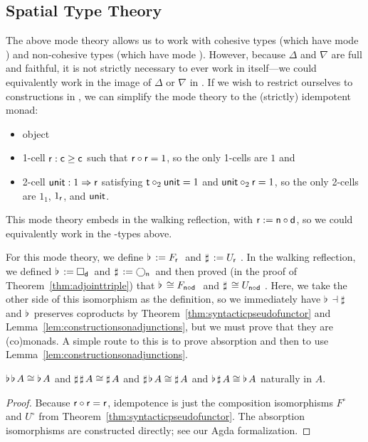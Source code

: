 \documentclass{drl-common/llncs}
\newcommand{\la}{\ensuremath{\dashv}}
\newcommand{\tc}[2]{\ensuremath{#1 \Rightarrow #2}}
\newcommand\compo[2]{\ensuremath{#1 \circ #2}}
\newcommand\comph[2]{\ensuremath{#1 \mathbin{\circ_2} #2}}
\newcommand\F[2]{\ensuremath{F_{#1} \,\, #2}}
\newcommand\U[2]{\ensuremath{U_{#1} \,\, #2}}
\newcommand\Bx[2]{\ensuremath{\Box_{#1} \, {#2}}}
\newcommand\Crc[2]{\ensuremath{\bigcirc_{#1} \, {#2}}}
\newcommand\Flat[1]{\ensuremath{\flat \, {#1}}}
\newcommand\Sharp[1]{\ensuremath{\sharp \, {#1}}}
\begin{document}
\subsection{Spatial Type Theory}
\label{sec:idempotent}

The above mode theory allows us to work with cohesive types (which have
mode ) and non-cohesive types (which have mode ).
However, because $\Delta$ and $\nabla$ are full and faithful, it is not
strictly necessary to ever work in  itself---we could
equivalently work in the image of $\Delta$ or $\nabla$ in .  If
we wish to restrict ourselves to constructions in , we can
simplify the mode theory to the (strictly) idempotent monad:
\begin{itemize}
\item object 
\item 1-cell $\mathsf{r} : \mathsf{c} \ge \mathsf{c}$ such that
  $\compo{\dsd{r}}{\dsd{r}} = 1$, so the only 1-cells are $1$ and 
\item 2-cell $\dsd{unit} : \tc{1}{\dsd{r}}$ satisfying $\comph{\dsd
  t}{\dsd{unit}} = 1$ and $\comph{\dsd{unit}}{\dsd{r}} = 1$, so 
  the only 2-cells are $1_1$, $1_{\mathsf{r}}$, and  $\mathsf{unit}$. 
\end{itemize}
This mode theory embeds in the walking reflection, with $\dsd{r} :=
\compo{\dsd{n}}{\dsd{d}}$, so we could equivalently work in the
-types above.

For this mode theory, we define $\Flat{} := \F{\dsd{r}}{}$ and $\Sharp{}
:= \U{\dsd{r}}{}$.  In the walking reflection, we defined $\Flat{} :=
\Bx{\dsd{d}}{}$ and $\Sharp{} := \Crc{\dsd{n}}{}$ and then proved (in
the proof of Theorem~\ref{thm:adjointtriple}) that $\Flat{} \iso
\F{\compo{\dsd n}{\dsd d}}$ and $\Sharp{} \iso \U{\compo{\dsd n}{\dsd
    d}}$. Here, we take the other side of this isomorphism as the
definition, so we immediately have $\Flat{} \la \Sharp{}$ and $\Flat{}$
preserves coproducts by Theorem~\ref{thm:syntacticpseudofunctor} and
Lemma~\ref{lem:constructionsonadjunctions}, but we must prove that they
are (co)monads.  A simple route to this is to prove
absorption and then to use Lemma~\ref{lem:constructionsonadjunctions}.  

\begin{theorem}
 $\Flat{\Flat A} \iso \Flat A$ and $\Sharp{\Sharp A} \iso \Sharp A$
and $\Sharp{\Flat A} \iso \Sharp{A}$ 
and $\Flat{\Sharp A} \iso \Flat{A}$ naturally in $A$.
\end{theorem}
\begin{proof}
Because $\compo{\dsd r}{\dsd r} = {\dsd r}$, idempotence is just the composition
isomorphisms $F^\circ$ and $U^\circ$ from
Theorem~\ref{thm:syntacticpseudofunctor}.  The absorption isomorphisms
are constructed directly; see our Agda formalization.
\end{proof}
\end{document}
